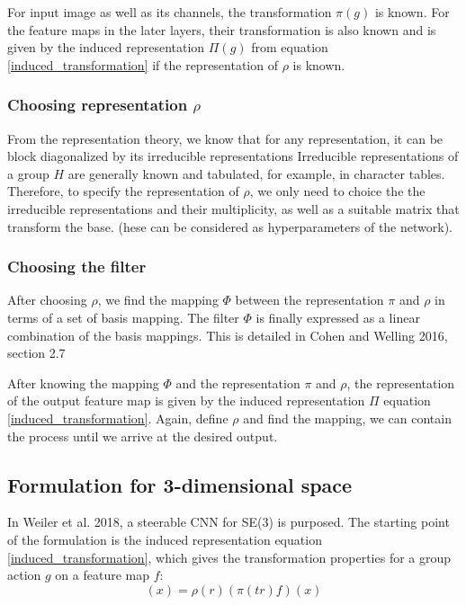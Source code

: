 \documentclass{article}
\begin{document}
For input image as well as its channels, the transformation $\pi(g)$ is known. For the feature maps in the later layers, 
their transformation is also known and is given by the induced representation $\Pi(g)$ from equation \eqref{induced_transformation}
if the representation of $\rho$ is known. 

\subsubsection*{Choosing representation $\rho$}
From the representation theory, we know that for any representation, it can be 
block diagonalized by its irreducible representations
Irreducible representations of a group $H$ are generally known and tabulated, for example, in character tables. 
Therefore, to specify the representation of $\rho$, we 
only need to choice the the irreducible representations and their multiplicity, as well as a suitable matrix that transform the base.
(hese can be considered as hyperparameters of the network).

\subsubsection*{Choosing the filter}
After choosing $\rho$, we find the mapping $\Phi$ between the representation $\pi$ and $\rho$ in terms of a set of 
basis mapping. The filter $\Phi$ is finally expressed as a linear combination of the basis mappings. This is detailed in 
Cohen and Welling 2016, section 2.7

After knowing the mapping $\Phi$ and the representation $\pi$ and $\rho$, the representation of the output feature map is given by 
the induced representation $\Pi$ equation \eqref{induced_transformation}. Again, define $\rho$ and find the mapping, we can 
contain the process until we arrive at the desired output.


\subsection{Formulation for 3-dimensional space}
In Weiler et al. 2018, a steerable CNN for SE(3) is purposed. 
The starting point of the formulation is the induced representation equation \eqref{induced_transformation}, which gives the transformation 
properties for a group action $g$ on a feature map $f$:
\begin{equation}
    [\Pi(tr) f ](x)= \rho(r) (\pi(tr) f) (x)
\end{equation}
\end{document}
